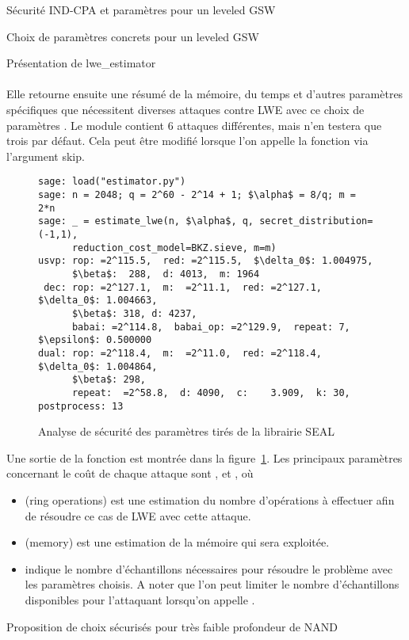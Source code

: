\begin{section}{Sécurité IND-CPA et paramètres pour un leveled GSW}
\begin{subsection}{Choix de paramètres concrets pour un leveled GSW}
\begin{subsubsection}{Présentation de lwe\_estimator}
\paragraph{}
Elle retourne ensuite une résumé de la mémoire, du temps et d'autres paramètres spécifiques que nécessitent
diverses attaques contre LWE avec ce choix de paramètres . Le module contient 6 attaques différentes, mais n'en testera que
trois par défaut. Cela peut être modifié lorsque l'on appelle la fonction  via l'argument skip.
\flushleft
\begin{figure}
\begin{lstlisting}[mathescape=true]
sage: load("estimator.py")
sage: n = 2048; q = 2^60 - 2^14 + 1; $\alpha$ = 8/q; m = 2*n
sage: _ = estimate_lwe(n, $\alpha$, q, secret_distribution=(-1,1), 
	  reduction_cost_model=BKZ.sieve, m=m)
usvp: rop: =2^115.5,  red: =2^115.5,  $\delta_0$: 1.004975,  
      $\beta$:  288,  d: 4013,  m: 1964
 dec: rop: =2^127.1,  m:  =2^11.1,  red: =2^127.1,  $\delta_0$: 1.004663,  
      $\beta$: 318, d: 4237,  
      babai: =2^114.8,  babai_op: =2^129.9,  repeat: 7,  $\epsilon$: 0.500000
dual: rop: =2^118.4,  m:  =2^11.0,  red: =2^118.4,  $\delta_0$: 1.004864,  
      $\beta$: 298,  
      repeat:  =2^58.8,  d: 4090,  c:    3.909,  k: 30, postprocess: 13
\end{lstlisting}
\caption{Analyse de sécurité des paramètres tirés de la librairie SEAL}
\label{fig:seal_estimate}
\end{figure}


\vspace{0.2cm}
Une sortie de la fonction  est montrée dans la figure~\ref{fig:seal_estimate}.
Les principaux paramètres concernant le coût de chaque attaque sont ,  et , où

\begin{itemize}
\item {} (ring operations) est une estimation du nombre d'opérations à effectuer afin de résoudre ce cas de LWE avec cette attaque.
\item  {} (memory) est une estimation de la mémoire qui sera exploitée.
\item {} indique le nombre d'échantillons nécessaires pour résoudre le problème avec les paramètres choisis. 
A noter que l'on peut limiter le nombre d'échantillons disponibles pour l'attaquant
lorsqu'on appelle .
\end{itemize}

\end{subsubsection}
\begin{subsubsection}{Proposition de choix sécurisés pour très faible profondeur de NAND} \label{sec:choix_concrets}

\end{subsubsection}
\end{subsection}
\end{section}
